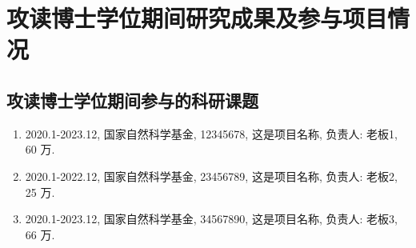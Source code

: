 \chapter*{攻读博士学位期间研究成果及参与项目情况}


\section*{攻读博士学位期间参与的科研课题}

\begin{enumerate}[label=\arabic*., labelindent=0em, leftmargin=*]
    \item 2020.1-2023.12, 国家自然科学基金, 12345678, 这是项目名称, 负责人: 老板1, 60 万.
    \item 2020.1-2022.12, 国家自然科学基金, 23456789, 这是项目名称, 负责人: 老板2, 25 万.
    \item 2020.1-2023.12, 国家自然科学基金, 34567890, 这是项目名称, 负责人: 老板3, 66 万.
\end{enumerate}
